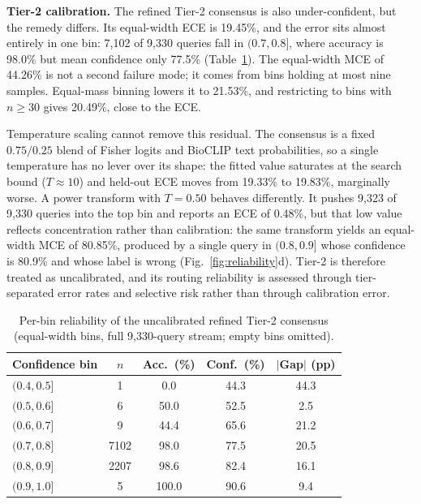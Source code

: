 \documentclass[preprint,12pt]{elsarticle}
\begin{document}
\textbf{Tier-2 calibration.} The refined Tier-2 consensus is also under-confident, but the remedy differs. Its equal-width ECE is 19.45\%, and the error sits almost entirely in one bin: 7,102 of 9,330 queries fall in $(0.7,0.8]$, where accuracy is 98.0\% but mean confidence only 77.5\% (Table~\ref{tab:reliability_bins}). The equal-width MCE of 44.26\% is not a second failure mode; it comes from bins holding at most nine samples. Equal-mass binning lowers it to 21.53\%, and restricting to bins with $n\geq30$ gives 20.49\%, close to the ECE.

Temperature scaling cannot remove this residual. The consensus is a fixed $0.75/0.25$ blend of Fisher logits and BioCLIP text probabilities, so a single temperature has no lever over its shape: the fitted value saturates at the search bound ($T\approx10$) and held-out ECE moves from 19.33\% to 19.83\%, marginally worse. A power transform with $T=0.50$ behaves differently. It pushes 9,323 of 9,330 queries into the top bin and reports an ECE of 0.48\%, but that low value reflects concentration rather than calibration: the same transform yields an equal-width MCE of 80.85\%, produced by a single query in $(0.8,0.9]$ whose confidence is 80.9\% and whose label is wrong (Fig.~\ref{fig:reliability}d). Tier-2 is therefore treated as uncalibrated, and its routing reliability is assessed through tier-separated error rates and selective risk rather than through calibration error.

\begin{table}[htbp]
\caption{Per-bin reliability of the uncalibrated refined Tier-2 consensus (equal-width bins, full 9,330-query stream; empty bins omitted).}
\label{tab:reliability_bins}
\centering

\footnotesize
\begin{tabular}{lcccc}
\toprule
\textbf{Confidence bin} & \textbf{$n$} & \textbf{Acc.\ (\%)} & \textbf{Conf.\ (\%)} & \textbf{$|$Gap$|$ (pp)} \\
\midrule
$(0.4,0.5]$ & 1    & 0.0   & 44.3 & 44.3 \\
$(0.5,0.6]$ & 6    & 50.0  & 52.5 & 2.5 \\
$(0.6,0.7]$ & 9    & 44.4  & 65.6 & 21.2 \\
$(0.7,0.8]$ & 7102 & 98.0  & 77.5 & 20.5 \\
$(0.8,0.9]$ & 2207 & 98.6  & 82.4 & 16.1 \\
$(0.9,1.0]$ & 5    & 100.0 & 90.6 & 9.4 \\
\bottomrule
\end{tabular}
\end{table}
\end{document}
